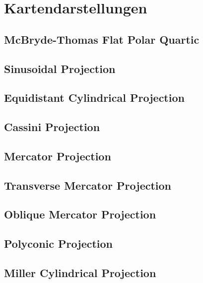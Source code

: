\section{Kartendarstellungen}
\label{sec:2}
 









\subsection{McBryde-Thomas Flat Polar Quartic}
\label{sec:2.11}
\subsection{Sinusoidal Projection}
\label{sec:2.12}
\subsection{Equidistant Cylindrical Projection}
\label{sec:2.13}
\subsection{Cassini Projection}
\label{sec:2.14}
\subsection{Mercator Projection}
\label{sec:2.15}
\subsection{Transverse Mercator Projection}
\label{sec:2.16}
\subsection{Oblique Mercator Projection}
\label{sec:2.17}
\subsection{Polyconic Projection}
\label{sec:2.18}
\subsection{Miller Cylindrical Projection}
\label{sec:2.19}
